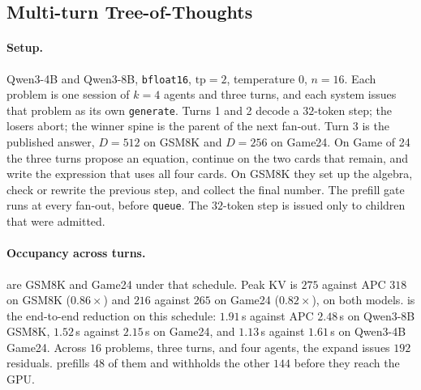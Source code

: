 \subsection{Multi-turn Tree-of-Thoughts}
\label{sec:eval-mt}

\paragraph{Setup.}
Qwen3-4B and Qwen3-8B, \texttt{bfloat16}, $\mathrm{tp}{=}2$, temperature $0$, $n{=}16$.
Each problem is one session of $k{=}4$ agents and three turns, and each system issues that problem as its own \texttt{generate}.
Turns 1 and 2 decode a $32$-token step; the losers abort; the winner spine is the parent of the next fan-out.
Turn 3 is the published answer, $D{=}512$ on GSM8K and $D{=}256$ on Game24.
On Game of 24 the three turns propose an equation, continue on the two cards that remain, and write the expression that uses all four cards.
On GSM8K they set up the algebra, check or rewrite the previous step, and collect the final number.
The prefill gate runs at every fan-out, before \texttt{queue}.
The $32$-token step is issued only to children that were admitted.

\paragraph{Occupancy across turns.}
 are GSM8K and Game24 under that schedule.
Peak KV is $275$ against APC $318$ on GSM8K ($0.86\times$) and $216$ against $265$ on Game24 ($0.82\times$), on both models.
\plus is the end-to-end reduction on this schedule: $1.91$\,s against APC $2.48$\,s on Qwen3-8B GSM8K, $1.52$\,s against $2.15$\,s on Game24, and $1.13$\,s against $1.61$\,s on Qwen3-4B Game24.
Across $16$ problems, three turns, and four agents, the expand issues $192$ residuals.
\plus prefills $48$ of them and withholds the other $144$ before they reach the GPU.

